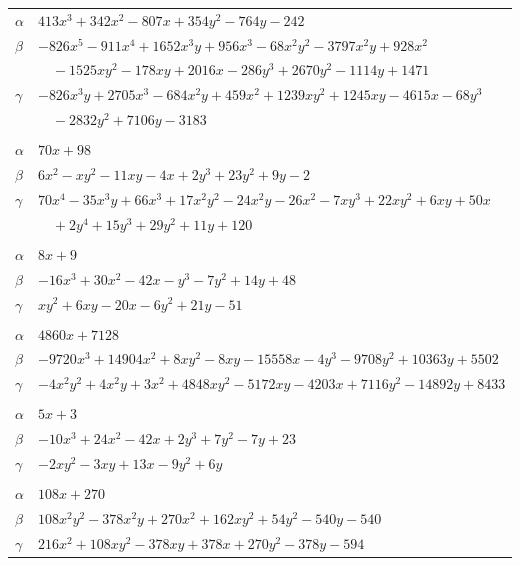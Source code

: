 \documentclass[11pt]{article}
\begin{document}
\begin{longtable}{@{}ll@{}}
$\alpha$ & $413x^{3}+342x^{2}-807x+354y^{2}-764y-242$\\
$\beta$ & $-826x^{5}-911x^{4}+1652x^{3}y+956x^{3}-68x^{2}y^{2}-3797x^{2}y+928x^{2}$\\
 & $\quad -1525xy^{2}-178xy+2016x-286y^{3}+2670y^{2}-1114y+1471$\\
$\gamma$ & $-826x^{3}y+2705x^{3}-684x^{2}y+459x^{2}+1239xy^{2}+1245xy-4615x-68y^{3}$\\
 & $\quad -2832y^{2}+7106y-3183$\\
\addlinespace[3pt]
\multicolumn{2}{@{}l}{$\{i,j\}=\{72,225\}$, $k_{ij}=2^{3}\cdot 3\cdot 7$}\\
$\alpha$ & $70x+98$\\
$\beta$ & $6x^{2}-xy^{2}-11xy-4x+2y^{3}+23y^{2}+9y-2$\\
$\gamma$ & $70x^{4}-35x^{3}y+66x^{3}+17x^{2}y^{2}-24x^{2}y-26x^{2}-7xy^{3}+22xy^{2}+6xy+50x$\\
 & $\quad +2y^{4}+15y^{3}+29y^{2}+11y+120$\\
\addlinespace[3pt]
\multicolumn{2}{@{}l}{$\{i,j\}=\{73,74\}$, $k_{ij}=3^{2}\cdot 19$}\\
$\alpha$ & $8x+9$\\
$\beta$ & $-16x^{3}+30x^{2}-42x-y^{3}-7y^{2}+14y+48$\\
$\gamma$ & $xy^{2}+6xy-20x-6y^{2}+21y-51$\\
\addlinespace[3pt]
\multicolumn{2}{@{}l}{$\{i,j\}=\{73,75\}$, $k_{ij}=2^{2}\cdot 3^{4}\cdot 13^{2}$}\\
$\alpha$ & $4860x+7128$\\
$\beta$ & $-9720x^{3}+14904x^{2}+8xy^{2}-8xy-15558x-4y^{3}-9708y^{2}+10363y+5502$\\
$\gamma$ & $-4x^{2}y^{2}+4x^{2}y+3x^{2}+4848xy^{2}-5172xy-4203x+7116y^{2}-14892y+8433$\\
\addlinespace[3pt]
\multicolumn{2}{@{}l}{$\{i,j\}=\{73,77\}$, $k_{ij}=2\cdot 3\cdot 13$}\\
$\alpha$ & $5x+3$\\
$\beta$ & $-10x^{3}+24x^{2}-42x+2y^{3}+7y^{2}-7y+23$\\
$\gamma$ & $-2xy^{2}-3xy+13x-9y^{2}+6y$\\
\addlinespace[3pt]
\multicolumn{2}{@{}l}{$\{i,j\}=\{73,78\}$, $k_{ij}=2\cdot 3^{3}\cdot 7$}\\
$\alpha$ & $108x+270$\\
$\beta$ & $108x^{2}y^{2}-378x^{2}y+270x^{2}+162xy^{2}+54y^{2}-540y-540$\\
$\gamma$ & $216x^{2}+108xy^{2}-378xy+378x+270y^{2}-378y-594$\\

\end{longtable}
\end{document}
